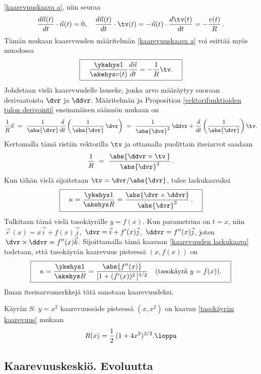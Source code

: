 \eqref{kaarevuuskaava a}, niin seuraa
\[
\frac{d\vec n(t)}{dt}\cdot\vec n(t)=0, \quad
\frac{d\vec n(t)}{dt}\cdot\tv(t) = -\vec n(t)\cdot\frac{d\tv(t)}{dt}=-\frac{v(t)}{R}\,.
\]
Tämän mukaan kaarevuuden määritelmän \eqref{kaarevuuskaava a} voi esittää myös muodossa
\begin{equation} \label{kaarevuuskaava b}
\boxed{\quad \frac{\ykehys 1}{\akehys v(t)}\frac{d\vec n}{dt}
              =-\frac{1}{R}\tv. \quad }
\end{equation}
Johdetaan vielä kaarevuudelle lauseke, jonka arvo määräytyy suoraan derivaatoista $\dvr$ ja 
$\ddvr$. Määritelmän ja Proposition \ref{vektorifunktioiden tulon derivointi} ensimmäisen
säännön mukaan on
\[
\frac{1}{R}\vec n\ =\ \frac{1}{\abs{\dvr}}\frac{d}{dt}\left(\frac{1}{\abs{\dvr}}\,\dvr\right)\
             =\ \frac{1}{\abs{\dvr}^2}\,\ddvr+\frac{d}{dt}\left(\frac{1}{\abs{\dvr}}\right)\tv.
\]
Kertomalla tämä ristiin vektorilla $\tv$ ja ottamalla puolittain itseiarvot saadaan
\[
\frac{1}{R}\ =\ \frac{\abs{\ddvr\times\tv\,}}{\abs{\dvr}^2}\,.
\]
Kun tähän vielä sijoitetaan $\tv=\dvr/\abs{\dvr}$, tulee laskukaavaksi
\begin{equation} \label{kaarevuuden laskukaava}
\boxed{\quad \kappa = \frac{\ykehys 1}{\akehys R}
                    =\frac{\abs{\dvr\times\ddvr}}{\abs{\dvr}^3}\,. \quad}
\end{equation}
Tulkitaan tämä vielä tasokäyrälle $y=f(x)$. Kun parametrina on $t=x$, niin
$\,\vec r\,(x) = x\vec i + f(x)\vec j$, $\,\dvr = \vec i + f'(x)\vec j$,
$\,\ddvr=f''(x)\vec j$, joten $\,\dvr\times\ddvr=f''(x)\vec k$. Sijoittamalla tämä kaavaan
\eqref{kaarevuuden laskukaava} todetaan, että tasokäyrän kaarevuus pisteessä $(x,f(x))$ on
\begin{equation} \label{tasokäyrän kaarevuus}
\boxed{\quad \kappa=\frac{\ykehys 1}{\akehys R}
     =\frac{\abs{f''(x)}}{[1+(f'(x))^2\,]^{3/2}} \quad (\text{tasokäyrä $y=f(x)$}). \quad}
\end{equation}
%
Ilman itseisarvomerkkejä tätä sanotaan  kaarevuudeksi.
\begin{Exa} Käyrän $S:\ y = x^2$ kaarevuussäde pisteessä $(x,x^2)$ on kaavan 
\eqref{tasokäyrän kaarevuus} mukaan
\[ R(x) = \frac{1}{2}\,(1+4x^2)^{3/2}. \loppu \]
\end{Exa}

\subsection{Kaarevuuskeskiö. Evoluutta}
 


